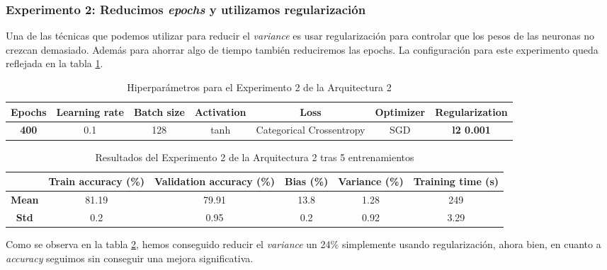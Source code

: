 \documentclass{article}
\begin{document}
			\newpage
			
			
		\subsubsection{Experimento 2: Reducimos \textit{epochs} y utilizamos regularizaci\'on}
		\label{d-s-a2-e2}
			Una de las t\'ecnicas que podemos utilizar para reducir el \textit{variance} es usar regularizaci\'on para controlar que los pesos de las neuronas no crezcan demasiado. Adem\'as para ahorrar algo de tiempo tambi\'en reduciremos las epochs. La configuraci\'on para este experimento queda reflejada en la tabla \ref{tab:hip-d-a2-e2}.
			\begin{table}[!h]
				\begin{center}
					\begin{tabular}{| c | c | c | c | c | c | c |}
						\textbf{Epochs} & \textbf{Learning rate} & \textbf{Batch size} & \textbf{Activation} & \textbf{Loss} & \textbf{Optimizer} & \textbf{Regularization} \\ \hline
						\textbf{400} & 0.1 & 128 & tanh & Categorical Crossentropy & SGD & \textbf{l2 0.001}
					\end{tabular}
					\caption{Hiperpar\'ametros para el Experimento 2 de la Arquitectura 2}
					\label{tab:hip-d-a2-e2}
				\end{center}
			\end{table}
			
			\begin{table}[!h]
				\begin{center}
					\begin{tabular}{ c | c | c | c | c | c |}
						\ & \textbf{Train accuracy (\%)} & \textbf{Validation accuracy (\%)} & \textbf{Bias (\%)} & \textbf{Variance (\%)} & \textbf{Training time (s)} \\ \hline
						\textbf{Mean} & 81.19 & 79.91 & 13.8 & 1.28 & 249\\ \hline
						\textbf{Std} & 0.2 & 0.95 & 0.2 & 0.92 & 3.29 \\ \hline
					\end{tabular}
					\caption{Resultados del Experimento 2 de la Arquitectura 2 tras 5 entrenamientos}
					\label{tab:res-d-a2-e2}
				\end{center}
			\end{table}
			
			Como se observa en la tabla \ref{tab:res-d-a2-e2}, hemos conseguido reducir el \textit{variance} un 24\% simplemente usando regularizaci\'on, ahora bien, en cuanto a \textit{accuracy} seguimos sin conseguir una mejora significativa.
			
\end{document}
